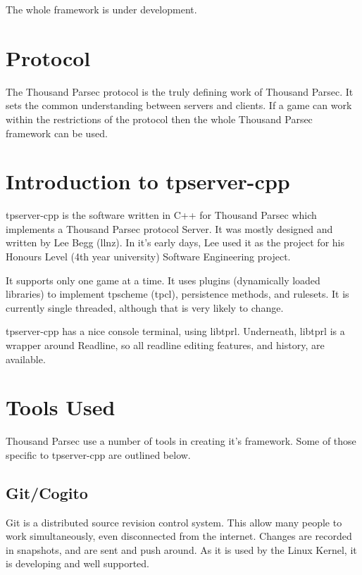\documentclass[a4paper,11pt]{report}
\begin{document}
The whole framework is under development.

\chapter{Protocol}
\label{chap:protocol-intro}

The Thousand Parsec protocol is the truly defining work of Thousand Parsec. It sets the common understanding between servers and clients. If a game can work within the restrictions of the protocol then the whole Thousand Parsec framework can be used.

\chapter{Introduction to tpserver-cpp}
\label{chap:tpserver-cpp-intro}
tpserver-cpp is the software written in C++ for Thousand Parsec which implements a Thousand Parsec protocol Server. It was mostly designed and written by Lee Begg (llnz). In it's early days, Lee used it as the project for his Honours Level (4th year university) Software Engineering project.

It supports only one game at a time. It uses plugins (dynamically loaded libraries) to implement tpscheme (tpcl), persistence methods, and rulesets. It is currently single threaded, although that is very likely to change.

tpserver-cpp has a nice console terminal, using libtprl. Underneath, libtprl is a wrapper around Readline, so all readline editing features, and history, are available.

\chapter{Tools Used}
\label{chap:tools}

Thousand Parsec use a number of tools in creating it's framework. Some of those specific to tpserver-cpp are outlined below.

\section{Git/Cogito}
\label{sec:git}

Git is a distributed source revision control system. This allow many people to work simultaneously, even disconnected from the internet. Changes are recorded in snapshots, and are sent and push around. As it is used by the Linux Kernel, it is developing and well supported.
\end{document}
